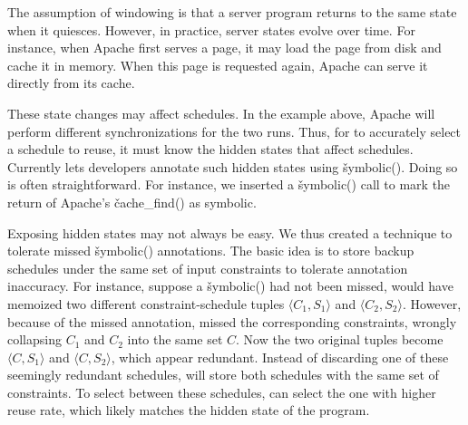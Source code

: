   The assumption of windowing is that a
server program returns to the same state when it quiesces.  However, in
practice, server states evolve over time.  For instance, when Apache first
serves a page, it may load the page from disk and cache it in memory.
When this page is requested again, Apache can serve it directly from its
cache.

These state changes may affect schedules.  In the example above, Apache
will perform different synchronizations for the two runs.  Thus, for
\tern to accurately select a schedule to reuse, it must know the hidden
states that affect schedules.  Currently \tern lets developers annotate
such hidden states using \v{symbolic()}.  Doing so is often
straightforward.  For instance, we inserted a \v{symbolic()} call to mark
the return of Apache's \v{cache\_find()} as symbolic.

Exposing hidden states may not always be easy.  We thus created a
technique to tolerate missed \v{symbolic()} annotations.  The basic idea
is to store backup schedules under the same set of input constraints to
tolerate annotation inaccuracy.  For instance, suppose a \v{symbolic()}
had not been missed, \tern would have memoized two different
constraint-schedule tuples $\langle C_1, S_1 \rangle$ and $\langle C_2,
S_2 \rangle$.  However, because of the missed annotation, \tern missed the
corresponding constraints, wrongly collapsing $C_1$ and $C_2$ into the
same set $C$.  Now the two original tuples become $\langle C, S_1 \rangle$
and $\langle C, S_2 \rangle$, which appear redundant.  Instead of
discarding one of these seemingly redundant schedules, \tern will store both
schedules with the same set of constraints.  To select between these
schedules, \tern can select the one with higher reuse rate, which likely
matches the hidden state of the program.



